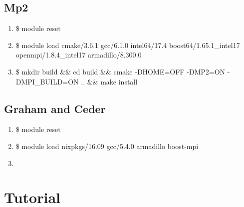 \documentclass[letterpaper,10pt,english]{sphinxmanual}
\begin{document}
\section{Mp2}
\label{\detokenize{installation:mp2}}\begin{enumerate}
\item {} 
\$ module reset

\item {} 
\$ module load cmake/3.6.1  gcc/6.1.0  intel64/17.4  boost64/1.65.1\_intel17 openmpi/1.8.4\_intel17  armadillo/8.300.0

\item {} 
\$ mkdir build \&\& cd build \&\& cmake -DHOME=OFF -DMP2=ON -DMPI\_BUILD=ON .. \&\& make install

\end{enumerate}


\section{Graham and Ceder}
\label{\detokenize{installation:graham-and-ceder}}\begin{enumerate}
\item {} 
\$ module reset

\item {} 
\$ module load nixpkgs/16.09  gcc/5.4.0 armadillo boost-mpi

\item {} 

\end{enumerate}
\label{\detokenize{tutorial:tutorial}}

\chapter{Tutorial}
\label{\detokenize{tutorial:id1}}\label{\detokenize{tutorial::doc}}
\end{document}
